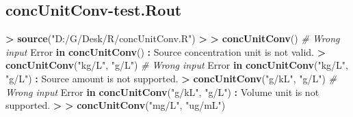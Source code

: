 \documentclass[10pt,]{krantz}
\makeatletter
\newenvironment{Shaded}{\begin{snugshade}}{\end{snugshade}}
\newcommand{\KeywordTok}[1]{\textcolor[rgb]{0.13,0.29,0.53}{\textbf{#1}}}
\newcommand{\StringTok}[1]{\textcolor[rgb]{0.31,0.60,0.02}{#1}}
\newcommand{\CommentTok}[1]{\textcolor[rgb]{0.56,0.35,0.01}{\textit{#1}}}
\newcommand{\ControlFlowTok}[1]{\textcolor[rgb]{0.13,0.29,0.53}{\textbf{#1}}}
\newcommand{\OperatorTok}[1]{\textcolor[rgb]{0.81,0.36,0.00}{\textbf{#1}}}
\newcommand{\ErrorTok}[1]{\textcolor[rgb]{0.64,0.00,0.00}{\textbf{#1}}}
\newcommand{\NormalTok}[1]{#1}
\newenvironment{kframe}{%
\medskip{}
\setlength{\fboxsep}{.8em}
 \def\at@end@of@kframe{}%
 \ifinner\ifhmode%
  \def\at@end@of@kframe{\end{minipage}}%
  \begin{minipage}{\columnwidth}%
 \fi\fi%
 \def\FrameCommand##1{\hskip\@totalleftmargin \hskip-\fboxsep
 \colorbox{shadecolor}{##1}\hskip-\fboxsep
     \hskip-\linewidth \hskip-\@totalleftmargin \hskip\columnwidth}%
 \MakeFramed {\advance\hsize-\width
   \@totalleftmargin\z@ \linewidth\hsize
   \@setminipage}}%
 {\par\unskip\endMakeFramed%
 \at@end@of@kframe}
\renewenvironment{Shaded}{\begin{kframe}}{\end{kframe}}
\makeatother
\begin{document}
\subsection{concUnitConv-test.Rout}\label{concunitconv-test.rout}

\begin{Shaded}
\begin{Highlighting}[]
\OperatorTok{>}\StringTok{ }\KeywordTok{source}\NormalTok{(}\StringTok{"D:/G/Desk/R/concUnitConv.R"}\NormalTok{)}
\OperatorTok{>}\StringTok{ }
\ErrorTok{>}\StringTok{ }\KeywordTok{concUnitConv}\NormalTok{() }\CommentTok{# Wrong input}
\NormalTok{Error }\ControlFlowTok{in} \KeywordTok{concUnitConv}\NormalTok{() }\OperatorTok{:}\StringTok{ }\NormalTok{Source concentration unit is not valid.}
\OperatorTok{>}\StringTok{ }\KeywordTok{concUnitConv}\NormalTok{(}\StringTok{"kg/L"}\NormalTok{, }\StringTok{"g/L"}\NormalTok{) }\CommentTok{# Wrong input}
\NormalTok{Error }\ControlFlowTok{in} \KeywordTok{concUnitConv}\NormalTok{(}\StringTok{"kg/L"}\NormalTok{, }\StringTok{"g/L"}\NormalTok{) }\OperatorTok{:}\StringTok{ }\NormalTok{Source amount is not supported.}
\OperatorTok{>}\StringTok{ }\KeywordTok{concUnitConv}\NormalTok{(}\StringTok{"g/kL"}\NormalTok{, }\StringTok{"g/L"}\NormalTok{) }\CommentTok{# Wrong input}
\NormalTok{Error }\ControlFlowTok{in} \KeywordTok{concUnitConv}\NormalTok{(}\StringTok{"g/kL"}\NormalTok{, }\StringTok{"g/L"}\NormalTok{) }\OperatorTok{:}\StringTok{ }\NormalTok{Volume unit is not supported.}
\OperatorTok{>}\StringTok{ }
\ErrorTok{>}\StringTok{ }\KeywordTok{concUnitConv}\NormalTok{(}\StringTok{"mg/L"}\NormalTok{, }\StringTok{"ug/mL"}\NormalTok{)}
  

\end{Highlighting}
\end{Shaded}
\end{document}

